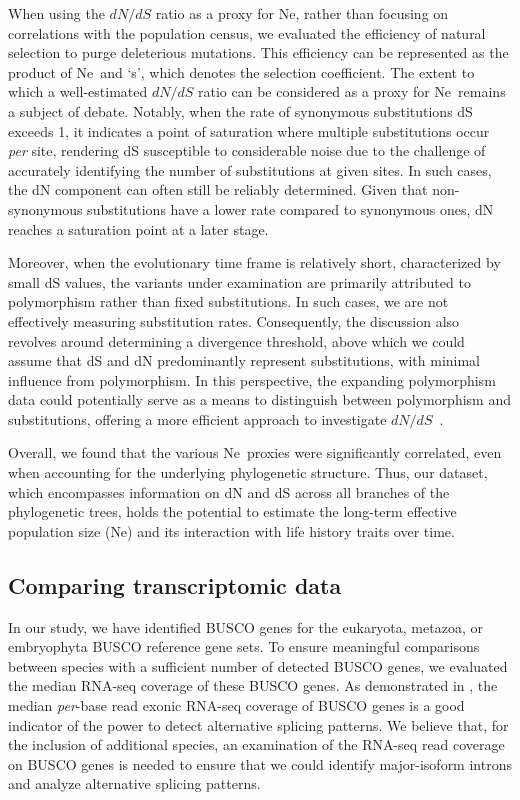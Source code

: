 When using the ${dN}/{dS}$ ratio as a proxy for \acrshort{Ne}, rather than focusing on correlations with the population census, we evaluated the efficiency of natural selection to purge deleterious mutations. This efficiency can be represented as the product of \acrshort{Ne}~and `\acrshort{s}', which denotes the selection coefficient. The extent to which a well-estimated ${dN}/{dS}$ ratio can be considered as a proxy for \acrshort{Ne}~remains a subject of debate. Notably, when the rate of synonymous \gls{substitution}s \gls{dS} exceeds 1, it indicates a point of saturation where multiple \gls{substitution}s occur \textit{per} site, rendering dS susceptible to considerable noise due to the challenge of accurately identifying the number of \gls{substitution}s at given sites. In such cases, the dN component can often still be reliably determined. Given that non-synonymous \gls{substitution}s have a lower rate compared to synonymous ones, \gls{dN} reaches a saturation point at a later stage.

Moreover, when the evolutionary time frame is relatively short, characterized by small \gls{dS} values, the variants under examination are primarily attributed to polymorphism rather than fixed substitutions. In such cases, we are not effectively measuring substitution rates. Consequently, the discussion also revolves around determining a divergence threshold, above which we could assume that \gls{dS} and \gls{dN} predominantly represent substitutions, with minimal influence from polymorphism. In this perspective, the expanding polymorphism data could potentially serve as a means to distinguish between polymorphism and substitutions, offering a more efficient approach to investigate ${dN}/{dS}$~\citep{mugal_why_2014}.

Overall, we found that the various \acrshort{Ne}~proxies were significantly correlated, even when accounting for the underlying phylogenetic structure. Thus, our dataset, which encompasses information on \gls{dN} and \gls{dS} across all branches of the phylogenetic trees, holds the potential to estimate the long-term effective population size (\acrshort{Ne}) and its interaction with life history traits over time.

\subsection{Comparing transcriptomic data}
In our study, we have identified \acrshort{BUSCO} genes for the eukaryota, metazoa, or embryophyta \acrshort{BUSCO} reference gene sets. To ensure meaningful comparisons between species with a sufficient number of detected \acrshort{BUSCO} genes, we evaluated the median RNA-seq coverage of these \acrshort{BUSCO} genes. As demonstrated in , the median \textit{per}-base read exonic RNA-seq coverage of \acrshort{BUSCO} genes is a good indicator of the power to detect alternative splicing patterns. We believe that, for the inclusion of additional species, an examination of the RNA-seq read coverage on \acrshort{BUSCO} genes is needed to ensure that we could identify major-isoform introns and analyze alternative splicing patterns.

